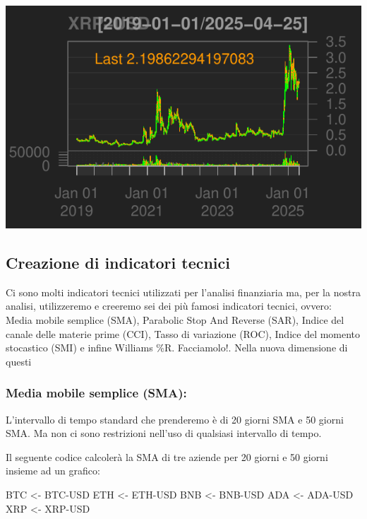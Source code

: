\documentclass[]{tufte-handout}
\newenvironment{Shaded}{}{}
\newcommand{\AttributeTok}[1]{\textcolor[rgb]{0.49,0.56,0.16}{#1}}
\newcommand{\NormalTok}[1]{#1}
\newcommand{\OtherTok}[1]{\textcolor[rgb]{0.00,0.44,0.13}{#1}}
\newcommand{\StringTok}[1]{\textcolor[rgb]{0.25,0.44,0.63}{#1}}
\begin{document}
\includegraphics{cripto_update_files/figure-latex/unnamed-chunk-3-5}

\subsection{Creazione di indicatori
tecnici}\label{creazione-di-indicatori-tecnici}

Ci sono molti indicatori tecnici utilizzati per l'analisi finanziaria
ma, per la nostra analisi, utilizzeremo e creeremo sei dei più famosi
indicatori tecnici, ovvero: Media mobile semplice (SMA), Parabolic Stop
And Reverse (SAR), Indice del canale delle materie prime (CCI), Tasso di
variazione (ROC), Indice del momento stocastico (SMI) e infine Williams
\%R. Facciamolo!. Nella nuova dimensione di questi

\subsubsection{Media mobile semplice
(SMA):}\label{media-mobile-semplice-sma}

L'intervallo di tempo standard che prenderemo è di 20 giorni SMA e 50
giorni SMA. Ma non ci sono restrizioni nell'uso di qualsiasi intervallo
di tempo.

Il seguente codice calcolerà la SMA di tre aziende per 20 giorni e 50
giorni insieme ad un grafico:

\begin{Shaded}
\begin{Highlighting}[]
\NormalTok{BTC }\OtherTok{\textless{}{-}} \StringTok{\textasciigrave{}}\AttributeTok{BTC{-}USD}\StringTok{\textasciigrave{}}
\NormalTok{ETH }\OtherTok{\textless{}{-}} \StringTok{\textasciigrave{}}\AttributeTok{ETH{-}USD}\StringTok{\textasciigrave{}}
\NormalTok{BNB }\OtherTok{\textless{}{-}} \StringTok{\textasciigrave{}}\AttributeTok{BNB{-}USD}\StringTok{\textasciigrave{}}
\NormalTok{ADA }\OtherTok{\textless{}{-}} \StringTok{\textasciigrave{}}\AttributeTok{ADA{-}USD}\StringTok{\textasciigrave{}}
\NormalTok{XRP }\OtherTok{\textless{}{-}} \StringTok{\textasciigrave{}}\AttributeTok{XRP{-}USD}\StringTok{\textasciigrave{}}
\end{Highlighting}
\end{Shaded}
\end{document}
